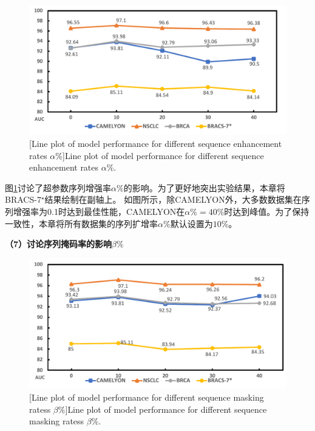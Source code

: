 \begin{figure}[h!]
  \centering
  \includegraphics[width=0.8\columnwidth]{figures/MixRatio.pdf}
  [Line plot of model performance for different sequence enhancement rates \texorpdfstring{$\alpha\%$}{}]{Line plot of model performance for different sequence enhancement rates \texorpdfstring{$\alpha\%$}{}.}
  \label{figure4: mixratio}
\end{figure}

图\ref{figure4: mixratio}讨论了超参数序列增强率$\alpha\%$的影响。为了更好地突出实验结果，本章将BRACS-7$^\star$结果绘制在副轴上。
如图所示，除CAMELYON外，大多数数据集在序列增强率为0.1时达到最佳性能，CAMELYON在$\alpha\%=40\%$时达到峰值。为了保持一致性，本章将所有数据集的序列扩增率$\alpha\%$默认设置为$10\%$。


\textbf{（7）讨论序列掩码率的影响\texorpdfstring{$\beta\%$}{}}

\begin{figure}[h!]
  \centering
  \includegraphics[width=0.8\columnwidth]{figures/MaskRatio.pdf}
  [Line plot of model performance for different sequence masking ratess \texorpdfstring{$\beta\%$}{}]{Line plot of model performance for different sequence masking ratess \texorpdfstring{$\beta\%$}{}.}
  \label{figure4: maskratio}
\end{figure}

